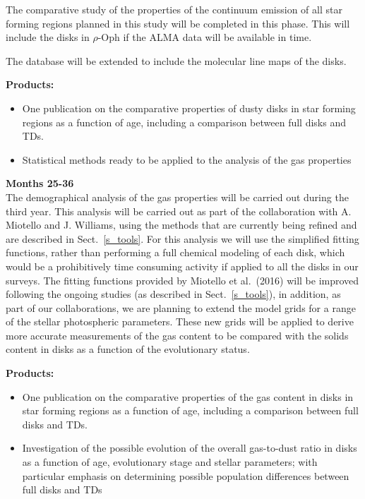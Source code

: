 \documentclass[10pt,fleqn,twoside]{article}
\begin{document}
The comparative study of the properties of the continuum emission of all star forming regions planned in this study will be completed in this phase. This will include the disks in $\rho$-Oph if the ALMA data will be available in time. 

The database will be extended to include the molecular line maps of the disks.
 
\smallskip
{\bf Products:} 
\begin{itemize}
\item One publication on the comparative properties of dusty disks in star forming regions as a function of age, including a comparison between full disks and TDs.
\item Statistical methods ready to be applied to the analysis of the gas properties
\end{itemize}

{\Tcol\bf Months 25-36}\\

The demographical analysis of the gas properties will be carried out during the third year. This analysis will be carried out as part of the collaboration with A. Miotello and J. Williams, using the methods that are currently being refined and are described in Sect.~\ref{s_tools}. For this analysis we will use the simplified fitting functions, rather than performing a full chemical modeling of each disk, which would be a prohibitively time consuming activity if applied to all the disks in our surveys. The fitting functions provided by Miotello et al.~(2016) will be improved following the ongoing studies (as described in Sect.~\ref{s_tools}), in addition, as part of our collaborations, we are planning to extend the model grids for a range of the stellar photospheric parameters. These new grids will be applied to derive more accurate measurements of the gas content to be compared with the solids content in disks as a function of the evolutionary status. 

\smallskip
{\bf Products:} 
\begin{itemize}
\item One publication on the comparative properties of the gas content in disks in star forming regions as a function of age, including a comparison between full disks and TDs.
\item Investigation of the possible evolution of the overall gas-to-dust ratio in disks as a function of age, evolutionary stage and stellar parameters; with particular emphasis on determining possible population differences between full disks and TDs
\end{itemize}
\end{document}
